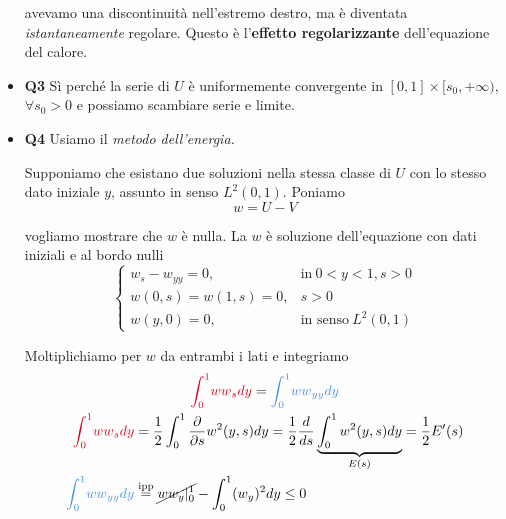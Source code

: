 \documentclass[10pt,a4paper,twoside,openright]{book}
\begin{document}
\begin{itemize}
avevamo una discontinuità nell'estremo destro, ma è diventata \textit{istantaneamente} regolare. Questo è l'\textbf{effetto regolarizzante} dell'equazione del calore.
\item \textbf{Q3} Sì perché la serie di $U$ è uniformemente convergente in $[ 0,1] \times [ s_{0},+\infty)$, $\forall s_{0}  >0$ e possiamo scambiare serie e limite.
\item \textbf{Q4} Usiamo il \textit{metodo dell'energia.}

Supponiamo che esistano due soluzioni nella stessa classe di $U$ con lo stesso dato iniziale $y$, assunto in senso $L^{2}(0,1)$. Poniamo\begin{equation*}
w=U-V
\end{equation*}

vogliamo mostrare che $w$ è nulla. La $w$ è soluzione dell'equazione con dati iniziali e al bordo nulli\begin{equation*}
\begin{cases}
w_{s} -w_{yy} =0, & \text{in} \ 0< y< 1,s >0\\
w(0,s) =w(1,s) =0, & \boxed{s >0}\\
w(y,0) =0, & \text{in senso} \ L^{2}(0,1)
\end{cases}
\end{equation*}

 Moltiplichiamo per $w$ da entrambi i lati e integriamo\begin{gather*}
\textcolor[rgb]{0.82,0.01,0.11}{\int ^{1}_{0}}\textcolor[rgb]{0.82,0.01,0.11}{ww}\textcolor[rgb]{0.82,0.01,0.11}{_{s}}\textcolor[rgb]{0.82,0.01,0.11}{dy} =\textcolor[rgb]{0.29,0.56,0.89}{\int ^{1}_{0}}\textcolor[rgb]{0.29,0.56,0.89}{ww}\textcolor[rgb]{0.29,0.56,0.89}{_{yy}}\textcolor[rgb]{0.29,0.56,0.89}{dy}\\
\begin{aligned}
\textcolor[rgb]{0.82,0.01,0.11}{\int ^{1}_{0}}\textcolor[rgb]{0.82,0.01,0.11}{ww}\textcolor[rgb]{0.82,0.01,0.11}{_{s}}\textcolor[rgb]{0.82,0.01,0.11}{dy} & =\frac{1}{2}\int ^{1}_{0}\frac{\partial }{\partial s} w^{2}(y,s) dy=\frac{1}{2}\frac{d}{ds}\underbrace{\int ^{1}_{0} w^{2}(y,s) dy}_{E(s)} =\frac{1}{2} E'(s)\\
\textcolor[rgb]{0.29,0.56,0.89}{\int ^{1}_{0}}\textcolor[rgb]{0.29,0.56,0.89}{ww}\textcolor[rgb]{0.29,0.56,0.89}{_{yy}}\textcolor[rgb]{0.29,0.56,0.89}{dy} & \overset{\text{ipp}}{=}\cancel{ww_{y} |^{1}_{0}} -\int ^{1}_{0}(w_{y})^{2} dy\leqslant 0
\end{aligned}
\end{gather*}


\end{itemize}
\end{document}
